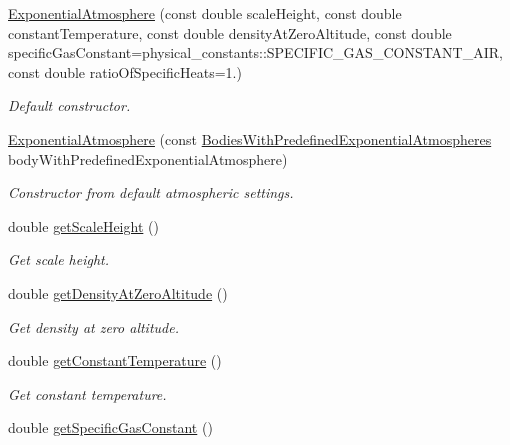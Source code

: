\begin{DoxyCompactItemize}
\item 
\hyperlink{classtudat_1_1aerodynamics_1_1ExponentialAtmosphere_a5ebde54a90c18ba708b8cadd7af3ab77}{Exponential\+Atmosphere} (const double scale\+Height, const double constant\+Temperature, const double density\+At\+Zero\+Altitude, const double specific\+Gas\+Constant=physical\+\_\+constants\+::\+S\+P\+E\+C\+I\+F\+I\+C\+\_\+\+G\+A\+S\+\_\+\+C\+O\+N\+S\+T\+A\+N\+T\+\_\+\+A\+IR, const double ratio\+Of\+Specific\+Heats=1.)
\begin{DoxyCompactList}\small\item\em Default constructor. \end{DoxyCompactList}\item 
\hyperlink{classtudat_1_1aerodynamics_1_1ExponentialAtmosphere_a6181b92d0720900d9e4ac5fdf34f705e}{Exponential\+Atmosphere} (const \hyperlink{classtudat_1_1aerodynamics_1_1ExponentialAtmosphere_a86631e9491185c2c0b8681acf2a13016}{Bodies\+With\+Predefined\+Exponential\+Atmospheres} body\+With\+Predefined\+Exponential\+Atmosphere)
\begin{DoxyCompactList}\small\item\em Constructor from default atmospheric settings. \end{DoxyCompactList}\item 
double \hyperlink{classtudat_1_1aerodynamics_1_1ExponentialAtmosphere_a74ca5778d0d81aa30339643421a33fbf}{get\+Scale\+Height} ()
\begin{DoxyCompactList}\small\item\em Get scale height. \end{DoxyCompactList}\item 
double \hyperlink{classtudat_1_1aerodynamics_1_1ExponentialAtmosphere_aa58c9c4e0920ed33187f7fae3c2cecd4}{get\+Density\+At\+Zero\+Altitude} ()
\begin{DoxyCompactList}\small\item\em Get density at zero altitude. \end{DoxyCompactList}\item 
double \hyperlink{classtudat_1_1aerodynamics_1_1ExponentialAtmosphere_a2cbcf84eef3d96e1b5ff52d93ce6c5c3}{get\+Constant\+Temperature} ()
\begin{DoxyCompactList}\small\item\em Get constant temperature. \end{DoxyCompactList}\item 
double \hyperlink{classtudat_1_1aerodynamics_1_1ExponentialAtmosphere_a77885b25ff2ac9e7218efea48ab231b6}{get\+Specific\+Gas\+Constant} ()

\end{DoxyCompactItemize}
